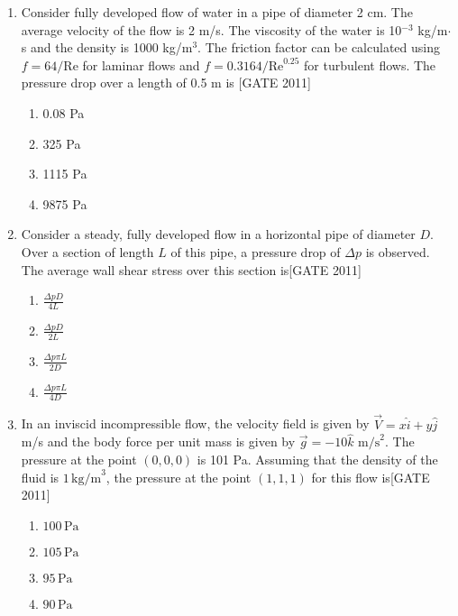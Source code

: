 \documentclass[journal,12pt,onecolumn]{IEEEtran}
\theoremstyle{remark}
\begin{document}
\begin{enumerate}
\item Consider fully developed flow of water in a pipe of diameter 2 cm. The average velocity of the flow is 2 m/s. The viscosity of the water is 10$^{-3}$ kg/m$\cdot$s and the density is 1000 kg/m$^3$. The friction factor can be calculated using $f = 64 / \text{Re}$ for laminar flows and $f = 0.3164 / \text{Re}^{0.25}$ for turbulent flows. The pressure drop over a length of 0.5 m is
\hfill{[GATE 2011]}
\begin{multicols}{4}
\begin{enumerate}
    \item 0.08 Pa
    \item 325 Pa
    \item 1115 Pa
    \item 9875 Pa
\end{enumerate}
\end{multicols}
\item Consider a steady, fully developed flow in a horizontal pipe of diameter $D$. Over a section of length $L$ of this pipe, a pressure drop of $\Delta p$ is observed. The average wall shear stress over this section is\hfill{[GATE 2011]}
    \begin{multicols}{4}
        \begin{enumerate}
            \item $\frac{\Delta p D}{4L}$
            \item $\frac{\Delta p D}{2L}$
            \item $\frac{\Delta p \pi L}{2D}$
            \item $\frac{\Delta p \pi L}{4D}$
        \end{enumerate}
    \end{multicols}
    
\item In an inviscid incompressible flow, the velocity field is given by $\vec{V} = x\hat{i} + y\hat{j}$ m/s and the body force per unit mass is given by $\vec{g} = -10\hat{k}  \text{ m/s}^2$. The pressure at the point $(0, 0, 0)$ is 101 Pa. Assuming that the density of the fluid is $1 \, \text{kg/m}^3$, the pressure at the point $(1, 1, 1)$ for this flow is\hfill{[GATE 2011]}
    \begin{multicols}{4}
        \begin{enumerate}
            \item $100 \, \text{Pa}$
            \item $105 \, \text{Pa}$
            \item $95 \, \text{Pa}$
            \item $90 \, \text{Pa}$
        \end{enumerate}
    \end{multicols}
    



\end{enumerate}
\end{document}
